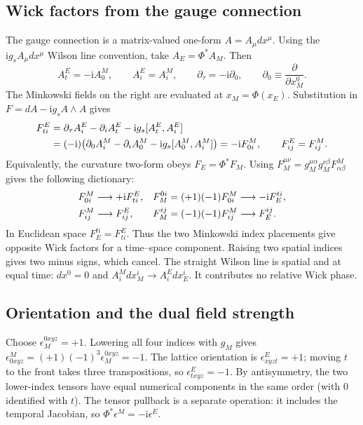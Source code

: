 \documentclass[11pt,a4paper]{article}
\newcommand{\ii}{\mathrm{i}}
\begin{document}
\subsection{Wick factors from the gauge connection}
The gauge connection is a matrix-valued one-form \(A=A_\mu dx^\mu\).
Using the \(\ii g_s A_\mu dx^\mu\) Wilson line convention, take
\(A_E=\Phi^*A_M\). Then
\begin{equation}
 A^E_t=-\ii A^M_0,\qquad A^E_i=A^M_i,\qquad
 \partial_\tau=-\ii\partial_0,\qquad
 \partial_0\equiv\frac{\partial}{\partial x_M^0}.
 \label{eq:wick-potential}
\end{equation}
The Minkowski fields on the right are evaluated at \(x_M=\Phi(x_E)\).
Substitution in \(F=dA-\ii g_s A\wedge A\) gives
\begin{align}
 F^E_{ti}
 &=\partial_\tau A^E_i-\partial_i A^E_t-\ii g_s[A^E_t,A^E_i]\notag\\
 &=(-\ii)\bigl(\partial_0 A^M_i-\partial_i A^M_0
                     -\ii g_s[A^M_0,A^M_i]\bigr)
 =-\ii F^M_{0i},\qquad F^E_{ij}=F^M_{ij}.
 \label{eq:wick-curvature}
\end{align}
Equivalently, the curvature two-form obeys \(F_E=\Phi^*F_M\). Using
\(F_M^{\mu\nu}=g_M^{\mu\alpha}g_M^{\nu\beta}F^M_{\alpha\beta}\) gives the
following dictionary:
\begin{align}
 F^M_{0i}&\longrightarrow +\ii F^E_{ti},&
 F_M^{0i}&=(+1)(-1)F^M_{0i}\longrightarrow-\ii F_E^{ti},\notag\\
 F^M_{ij}&\longrightarrow F^E_{ij},&
 F_M^{ij}&=(-1)(-1)F^M_{ij}\longrightarrow F_E^{ij}.
 \label{eq:wick-field-components}
\end{align}
In Euclidean space \(F_E^{ti}=F^E_{ti}\). Thus the two Minkowski index
placements give opposite Wick factors for a time--space component. Raising
two spatial indices gives two minus signs, which cancel. The straight
Wilson line is spatial and at equal time: \(dx^0=0\) and
\(A_i^M dx_M^i\longrightarrow A_i^E dx_E^i\). It contributes no relative
Wick phase.

\subsection{Orientation and the dual field strength}
Choose \(\epsilon_M^{0xyz}=+1\). Lowering all four indices with \(g_M\)
gives \(\epsilon^M_{0xyz}=(+1)(-1)^3\epsilon_M^{0xyz}=-1\). The lattice
orientation is \(\epsilon^E_{xyzt}=+1\); moving \(t\) to the front takes
three transpositions, so \(\epsilon^E_{txyz}=-1\). By antisymmetry, the two
lower-index tensors have equal numerical components in the same order
(with \(0\) identified with \(t\)). The tensor pullback is a separate
operation: it includes the temporal Jacobian, so
\(\Phi^*\epsilon^M=-\ii\epsilon^E\).
\end{document}
